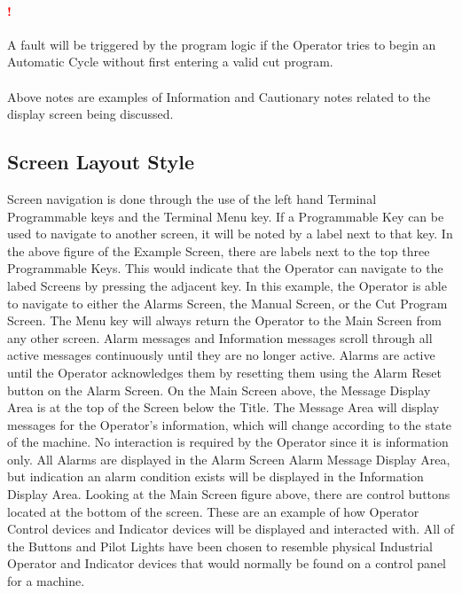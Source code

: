 \paragraph*{\textbf{{\LARGE \textcolor{red}{!}}}}A fault will be triggered by the program logic if the Operator tries to begin an Automatic Cycle without first entering a valid cut program.

\paragraph*{}
Above notes are examples of Information and Cautionary notes related to the display screen being discussed. 

\subsection{Screen Layout Style}
 Screen navigation is done through the use of the left hand Terminal Programmable keys and the Terminal Menu key. If a Programmable Key can be used to navigate to another screen, it will be noted by a label next to that key. In the above figure of the Example Screen, there are labels next to the top three Programmable Keys. This would indicate that the Operator can navigate to the labed Screens by pressing the adjacent key. In this example, the Operator is able to navigate to either the Alarms Screen, the Manual Screen, or the Cut Program Screen. The Menu key will always return the Operator to the Main Screen from any other screen. Alarm messages and Information messages scroll through all active messages continuously until they are no longer active. Alarms are active until the Operator acknowledges them by resetting them using the Alarm Reset button on the Alarm Screen. On the Main Screen above, the Message Display Area is at the top of the Screen below the Title. The Message Area will display messages for the Operator's information, which will change according to the state of the machine. No interaction is required by the Operator since it is information only. All Alarms are displayed in the Alarm Screen Alarm Message Display Area, but indication an alarm condition exists will be displayed in the Information Display Area. Looking at the Main Screen figure above, there are control buttons located at the bottom of the screen. These are an example of how Operator Control devices and Indicator devices will be displayed and interacted with. All of the Buttons and Pilot Lights have been chosen to resemble physical Industrial Operator and Indicator devices that would normally be found on a control panel for a machine.
